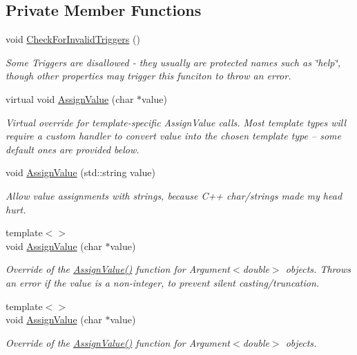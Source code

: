 \subsection*{Private Member Functions}
\begin{DoxyCompactItemize}
\item 
void \hyperlink{classJSL_1_1Argument_a8614eb66f807132c4323847e05e666c4}{Check\+For\+Invalid\+Triggers} ()
\begin{DoxyCompactList}\small\item\em Some Triggers are disallowed -\/ they usually are protected names such as \char`\"{}help\char`\"{}, though other properties may trigger this funciton to throw an error. \end{DoxyCompactList}\item 
virtual void \hyperlink{classJSL_1_1Argument_abc43696d406a6d369cd1b3d8cb1540b5}{Assign\+Value} (char $\ast$value)
\begin{DoxyCompactList}\small\item\em Virtual override for template-\/specific Assign\+Value calls. Most template types will require a custom handler to convert value into the chosen template type -- some default ones are provided below. \end{DoxyCompactList}\item 
void \hyperlink{classJSL_1_1Argument_af0c053ad614c0f20c48cf31389eee7e9}{Assign\+Value} (std\+::string value)
\begin{DoxyCompactList}\small\item\em Allow value assignments with strings, because C++ char/strings made my head hurt. \end{DoxyCompactList}\item 
{\footnotesize template$<$$>$ }\\void \hyperlink{classJSL_1_1Argument_a2b60a11be4f0ba28dfb3395c49ced06b}{Assign\+Value} (char $\ast$value)
\begin{DoxyCompactList}\small\item\em Override of the \hyperlink{classJSL_1_1Argument_abc43696d406a6d369cd1b3d8cb1540b5}{Assign\+Value()} function for Argument$<$double$>$ objects. Throws an error if the value is a non-\/integer, to prevent silent casting/truncation. \end{DoxyCompactList}\item 
{\footnotesize template$<$$>$ }\\void \hyperlink{classJSL_1_1Argument_afbd6b9b5c50de60cee39f4b0ab327375}{Assign\+Value} (char $\ast$value)
\begin{DoxyCompactList}\small\item\em Override of the \hyperlink{classJSL_1_1Argument_abc43696d406a6d369cd1b3d8cb1540b5}{Assign\+Value()} function for Argument$<$double$>$ objects. \end{DoxyCompactList}\item 

\end{DoxyCompactItemize}
